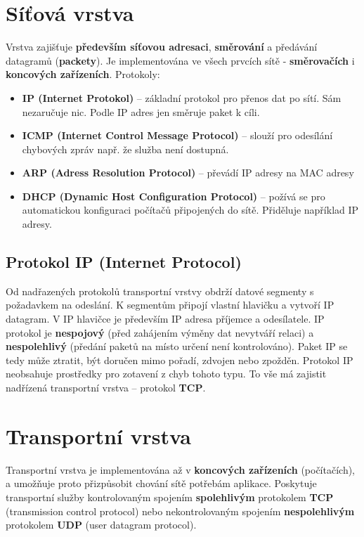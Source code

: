 \section{Síťová vrstva}
Vrstva zajišťuje \textbf{především síťovou adresaci}, \textbf{směrování} a předávání datagramů (\textbf{packety}). Je implementována ve všech prvcích sítě - \textbf{směrovačích} i \textbf{koncových zařízeních}. Protokoly:
\begin{itemize}
    \item \textbf{IP (Internet Protokol)} -- základní protokol pro přenos dat po sítí. Sám nezaručuje nic. Podle IP adres jen směruje paket k cíli.
    \item \textbf{ICMP (Internet Control Message Protocol)} -- slouží pro odesílání chybových zpráv např. že služba není dostupná.
    \item \textbf{ARP (Adress Resolution Protocol)} -- převádí IP adresy na MAC adresy
    \item \textbf{DHCP (Dynamic Host Configuration Protocol)} -- požívá se pro automatickou konfiguraci počítačů připojených do sítě. Přiděluje například IP adresy.
\end{itemize}

\subsection{Protokol IP (Internet Protocol)}
Od nadřazených protokolů transportní vrstvy obdrží datové segmenty s požadavkem na odeslání. K segmentům připojí vlastní hlavičku a vytvoří IP datagram. V IP hlavičce je především IP adresa příjemce a odesílatele. IP protokol je \textbf{nespojový} (před zahájením výměny dat nevytváří relaci) a \textbf{nespolehlivý} (předání paketů na místo určení není kontrolováno). Paket IP se tedy může ztratit, být doručen mimo pořadí, zdvojen nebo zpožděn. Protokol IP neobsahuje prostředky pro zotavení z chyb tohoto typu. To vše má zajistit nadřízená transportní vrstva – protokol \textbf{TCP}.

\section{Transportní vrstva}
Transportní vrstva je implementována až v \textbf{koncových zařízeních} (počítačích), a umožňuje proto přizpůsobit chování sítě potřebám aplikace. Poskytuje transportní služby kontrolovaným spojením \textbf{spolehlivým} protokolem \textbf{TCP} (transmission control protocol) nebo nekontrolovaným spojením \textbf{nespolehlivým} protokolem \textbf{UDP} (user datagram protocol).

